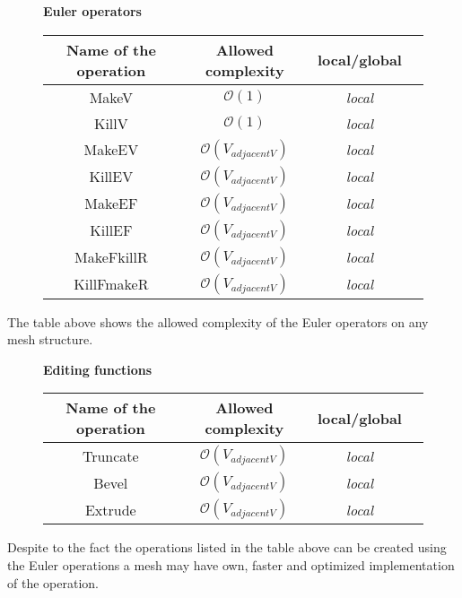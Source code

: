 \begin{figure}[!hbf]

\centering
\textbf{Euler operators}\\
\vspace{2mm}
\begin{tabular}{| c | c | c | c |}
\hline
\textbf{Name of the operation} & \textbf{Allowed complexity} & \textbf{local/global}\\
\hline
MakeV & $\mathcal{O}(1)$ & \emph{local}\\
\hline
KillV & $\mathcal{O}(1)$ & \emph{local}\\
\hline
MakeEV & $\mathcal{O}(V_{adjacentV})$ & \emph{local}\\
\hline
KillEV & $\mathcal{O}(V_{adjacentV})$ & \emph{local}\\
\hline
MakeEF & $\mathcal{O}(V_{adjacentV})$ & \emph{local}\\
\hline
KillEF & $\mathcal{O}(V_{adjacentV})$ & \emph{local}\\
\hline
MakeFkillR & $\mathcal{O}(V_{adjacentV})$ & \emph{local}\\
\hline
KillFmakeR & $\mathcal{O}(V_{adjacentV})$ & \emph{local}\\
\hline
\end{tabular}
\end{figure}
The table above shows the allowed complexity of the Euler operators on any mesh structure.

\begin{figure}[!hbf]

\centering
\textbf{Editing functions}\\
\vspace{2mm}
\begin{tabular}{| c | c | c | c |}
\hline
\textbf{Name of the operation} & \textbf{Allowed complexity} & \textbf{local/global}\\
\hline
Truncate & $\mathcal{O}(V_{adjacentV})$ & \emph{local}\\
\hline
Bevel & $\mathcal{O}(V_{adjacentV})$ & \emph{local}\\
\hline
Extrude & $\mathcal{O}(V_{adjacentV})$ & \emph{local}\\
\hline
\end{tabular}
\end{figure}
Despite to the fact the operations listed in the table above can be created using the
Euler operations a mesh may have own, faster and optimized implementation of the operation.

